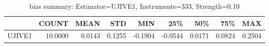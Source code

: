 \begin{table}[ht]
\centering
\caption{bias summary: Estimator=UJIVE1, Instruments=333, Strength=0.10}
\begin{tabular}{lrrrrrrrr}
\toprule
 & COUNT & MEAN & STD & MIN & 25\% & 50\% & 75\% & MAX \\
\midrule
UJIVE1 & 10.0000 & 0.0143 & 0.1255 & -0.1904 & -0.0544 & 0.0171 & 0.0824 & 0.2504 \\
\bottomrule
\end{tabular}
\end{table}
